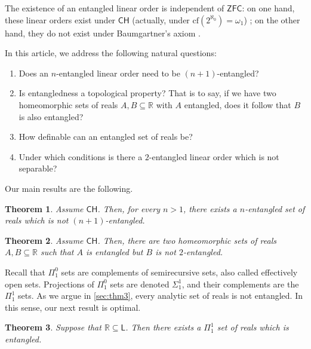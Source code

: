 \documentclass[12pt]{amsart}
\newtheorem{maintheorem}{Theorem}
\theoremstyle{definition}
\theoremstyle{remark}
\begin{document}
The existence of an entangled linear order is independent of $\mathsf{ZFC}$: on one hand, these linear orders exist under $\mathsf{CH}$ (actually, under $\mathrm{cf}(2^{\aleph_0}) = \omega_1$) \cite{MR799818, MR776283}; on the other hand, they do not exist under Baumgartner's axiom \cite{avraham1981martin}.

In this article, we address  the following natural questions:\vspace{0.3em}

\begin{enumerate}
\itemsep0.3em
\item Does an $n$-entangled linear order need to be $(n+1)$-entangled?
\item Is entangledness a topological property? That is to say, if we have two homeomorphic sets of reals $A, B \subseteq \mathbb{R}$ with $A$ entangled, does it follow that $B$ is also entangled?
\item How definable can an entangled set of reals be?
\item Under which conditions is there a $2$-entangled linear order which is not separable? \vspace{0.3em}
\end{enumerate}

Our main results are the following. 

\begin{maintheorem}\label{thm:1}
Assume $\mathsf{CH}$. Then, for every $n > 1$, there exists a $n$-entangled set of reals which is not $(n+1)$-entangled.
\end{maintheorem}

\begin{maintheorem}\label{thm:2}
Assume $\mathsf{CH}$. Then, there are two homeomorphic sets of reals $A,B\subseteq \mathbb{R}$ such that $A$ is entangled but $B$ is not $2$-entangled.
\end{maintheorem}


Recall that $\Pi^0_1$ sets are complements of semirecursive sets, also called effectively open sets. 
Projections of $\Pi^0_1$ sets are denoted $\Sigma^1_1$, and their complements are the $\Pi^1_1$ sets. As we argue in \cref{sec:thm3}, every analytic set of reals is not entangled. In this sense, our next result is optimal.


\begin{maintheorem}\label{thm:3}
Suppose that $ \mathbb{R}\subseteq \mathsf{L}$. Then there exists a $\Pi_1^1$ set of reals which is entangled.
\end{maintheorem}
\end{document}
